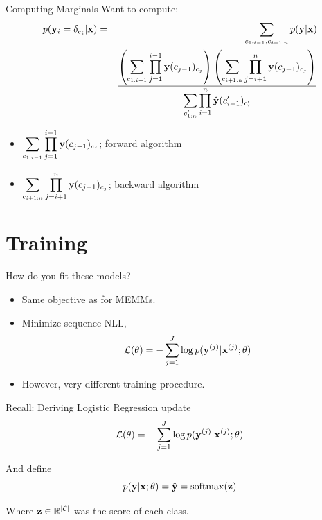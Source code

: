 \documentclass{beamer}
\begin{document}
 \begin{frame}{Computing Marginals}
   Want to compute:
   \begin{eqnarray*}
    p(\mathbf{y}_i =\delta_{c_i} | \mathbf{x}) &=& \sum_{c_{1:i-1}, c_{i+1:n}} p(\mathbf{y} | \mathbf{x})  \\
     &=& \frac{\displaystyle \left(\sum_{c_{1:i-1}} \prod_{j=1}^{i-1} \mathbf{y}(c_{j-1})_{c_j} \right) \left(\sum_{c_{i+1:n}} \prod_{j=i+1}^{n} \mathbf{y}(c_{j-1})_{c_j} \right)   } {\displaystyle \sum_{c'_{1:n}} \prod_{i=1}^n \hat{\mathbf{y}}(c'_{i-1})_{c'_i}}        
   \end{eqnarray*}


   \begin{itemize}
   \item $\displaystyle \sum_{c_{1:i-1}} \prod_{j=1}^{i-1} \mathbf{y}(c_{j-1})_{c_j} $; forward algorithm
     \air 
   \item $\displaystyle  \sum_{c_{i+1:n}} \prod_{j=i+1}^{n} \mathbf{y}(c_{j-1})_{c_j} $; backward algorithm
   \end{itemize}
 \end{frame}


 \section{Training}

 \begin{frame}{How do you fit these models?}
   \begin{itemize}
   \item Same objective as for MEMMs.
     
     \air

   \item Minimize sequence NLL,
     \[ \mathcal{L}(\theta) =  - \sum_{ j=1}^J  \log p(\mathbf{y}^{(j)} | \mathbf{x}^{(j)}; \theta) \]
 
     \air 

   \item However, very different training procedure.

   \end{itemize}

 \end{frame}



 \begin{frame}{Recall: Deriving Logistic Regression update}
   \[ \mathcal{L}(\theta) =  - \sum_{ j=1}^J  \log p(\mathbf{y}^{(j)} | \mathbf{x}^{(j)}; \theta) \]
   \air
   
   And define 
   \[ p(\boldy | \boldx; \theta) = \hat{\boldy} = \softmax(\boldz) \]
   \air 

   Where $\mathbf{z} \in \mathbb{R}^{|\mathcal{C}|}$ was the score of each class.
 \end{frame}
\end{document}
